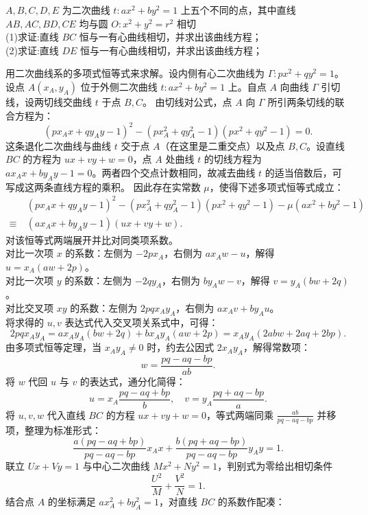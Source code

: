 \begin{example}
$A,B,C,D,E$ 为二次曲线 $t: ax^2+by^2=1$ 上五个不同的点，其中直线 $AB,AC,BD,CE$ 均与圆 $O: x^2+y^2=r^2$ 相切\\
(1)求证:直线 $BC$ 恒与一有心曲线相切，并求出该曲线方程；\\
(2)求证:直线 $DE$ 恒与一有心曲线相切，并求出该曲线方程；
\end{example}
\begin{solution}
用二次曲线系的多项式恒等式来求解。设内侧有心二次曲线为 $\Gamma: px^2 + qy^2 = 1$。
设点 $A(x_A, y_A)$ 位于外侧二次曲线 $t: ax^2 + by^2 = 1$ 上。自点 $A$ 向曲线 $\Gamma$ 引切线，设两切线交曲线 $t$ 于点 $B, C$。
由切线对公式，点 $A$ 向 $\Gamma$ 所引两条切线的联合方程为：
\[ (px_A x + qy_A y - 1)^2 - (px_A^2 + qy_A^2 - 1)(px^2 + qy^2 - 1) = 0. \]
这条退化二次曲线与曲线 $t$ 交于点 $A$（在这里是二重交点）以及点 $B, C$。设直线 $BC$ 的方程为 $ux + vy + w = 0$，点 $A$ 处曲线 $t$ 的切线方程为 $ax_A x + by_A y - 1 = 0$。两者四个交点计数相同，故减去曲线 $t$ 的适当倍数后，可写成这两条直线方程的乘积。
因此存在实常数 $\mu$，使得下述多项式恒等式成立：
\begin{align*}
    & (px_A x + qy_A y - 1)^2 - (px_A^2 + qy_A^2 - 1)(px^2 + qy^2 - 1) - \mu(ax^2 + by^2 - 1) \\
    \equiv\ & (ax_A x + by_A y - 1)(ux + vy + w).
\end{align*}
对该恒等式两端展开并比对同类项系数。\\
对比一次项 $x$ 的系数：左侧为 $-2p x_A$，右侧为 $a x_A w - u$，解得 $u = x_A(aw + 2p)$。\\
对比一次项 $y$ 的系数：左侧为 $-2q y_A$，右侧为 $b y_A w - v$，解得 $v = y_A(bw + 2q)$。\\
对比交叉项 $xy$ 的系数：左侧为 $2pq x_A y_A$，右侧为 $a x_A v + b y_A u$。\\
将求得的 $u, v$ 表达式代入交叉项关系式中，可得：
\[ 2pq x_A y_A = a x_A y_A(bw + 2q) + b x_A y_A(aw + 2p) = x_A y_A(2abw + 2aq + 2bp). \]
由多项式恒等定理，当 $x_A y_A \neq 0$ 时，约去公因式 $2x_A y_A$，解得常数项：
\[ w = \frac{pq - aq - bp}{ab}. \]
将 $w$ 代回 $u$ 与 $v$ 的表达式，通分化简得：
\[ u = x_A \frac{pq - aq + bp}{b}, \quad v = y_A \frac{pq + aq - bp}{a}. \]
将 $u, v, w$ 代入直线 $BC$ 的方程 $ux + vy + w = 0$，等式两端同乘 $\frac{ab}{pq - aq - bp}$ 并移项，整理为标准形式：
\[ \frac{a(pq - aq + bp)}{pq - aq - bp} x_A x + \frac{b(pq + aq - bp)}{pq - aq - bp} y_A y = 1. \]
联立 $Ux+Vy=1$ 与中心二次曲线 $Mx^2+Ny^2=1$，判别式为零给出相切条件
\[
\frac{U^2}{M}+\frac{V^2}{N}=1.
\]
结合点 $A$ 的坐标满足 $ax_A^2 + by_A^2 = 1$，对直线 $BC$ 的系数作配凑：

\end{solution}
